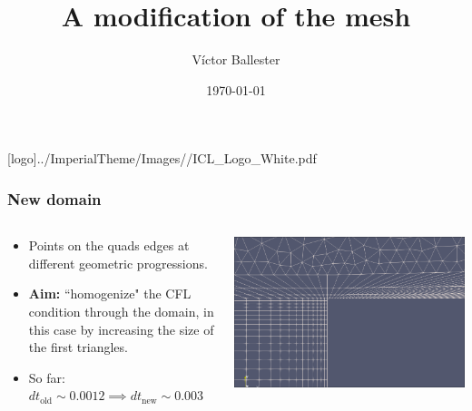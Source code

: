 \documentclass[
	aspectratio=169, %
	t, %
	onlytextwidth, %
	10pt, %
]{beamer}
\title{A modification of the mesh} %
\subtitle{} %
\author{Víctor Ballester} %
\date{\today} %
\def\imagefolder{../ImperialTheme/Images/}
\begin{document}
\begingroup
{} %
[logo]{\imagefolder/ICL_Logo_White.pdf} %
\frame[plain, s]{\titlepage} %
\endgroup

\begin{frame}
	\frametitle{New domain}
	\begin{columns}[T] %
	\begin{column}{0.38\linewidth} %
		\begin{itemize}
			\item Points on the quads edges at different geometric progressions.
			\item \textbf{Aim:} ``homogenize" the CFL condition through the domain, in this case by increasing the size of the first triangles.
			\item So far: $dt_\text{old} \sim 0.0012\implies dt_\text{new} \sim 0.003$
		\end{itemize}
	\end{column}
	\begin{column}{0.58\linewidth} %
		{
			\centering
			\includegraphics[width=\linewidth]{Images/zoomeddomain.png}
		}
	\end{column}
	\end{columns}
	
        
\end{frame}
\end{document}
